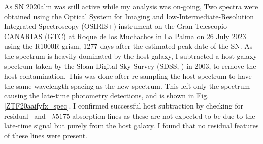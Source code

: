 \documentclass[a4paper,oneside,12pt, class=Latex/Classes/PhDthesisPSnPDF, crop=false]{standalone}
\begin{document}
As SN 2020alm was still active while my analysis was on-going, Two spectra were obtained using the Optical System for Imaging and low-Intermediate-Resolution Integrated Spectroscopy (OSIRIS+) instrument on the Gran Telescopio CANARIAS (GTC) at Roque de los Muchachos in La Palma on 26 July 2023 using the R1000R grism, 1277 days after the estimated peak date of the SN. As the spectrum is heavily dominated by the host galaxy, I subtracted a host galaxy spectrum taken by the Sloan Digital Sky Survey (SDSS, \citealt{SDSS-I-II, SDSS_DR4, SDSS_telescope, SDSS_Spectograph}) in 2003, to remove the host contamination. This was done after re-sampling the host spectrum to have the same wavelength spacing as the new spectrum. This left only the spectrum causing the late-time photometry detections, and is shown in Fig. \ref{ZTF20aaifyfx_spec}. I confirmed successful host subtraction by checking for residual \NaID~and \MgI~${\lambda5175}$ absorption lines as these are not expected to be due to the late-time signal but purely from the host galaxy. I found that no residual features of these lines were present.
\end{document}
